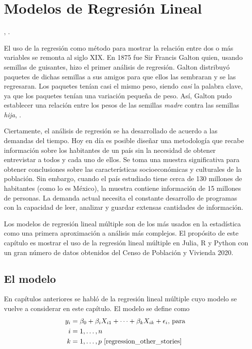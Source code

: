 \chapter{Modelos de Regresión Lineal}

, \cite{seber2003linear}. 

El uso de la regresión como método para mostrar la relación entre dos o más variables se remonta al siglo XIX. En 1875 fue Sir Francis Galton quien, usando semillas de guisantes, hizo el primer análisis de regresión. Galton distribuyó paquetes de dichas semillas a sus amigos para que ellos las sembraran y se las regresaran. Los paquetes tenían casi el mismo peso, siendo \textit{casi} la palabra clave, ya que los paquetes tenían una variación pequeña de peso. Así, Galton pudo establecer una relación entre los pesos de las semillas \textit{madre} contra las semillas \textit{hija}, \cite{stanton2001galton}. 

Ciertamente, el análisis de regresión se ha desarrollado de acuerdo a las demandas del tiempo. Hoy en día es posible diseñar una metodología que recabe información sobre los habitantes de un país sin la necesidad de obtener entrevistar a todos y cada uno de ellos. Se toma una muestra significativa para obtener conclusiones sobre las características socioeconómicas y culturales de la población. Sin embargo, cuando el país estudiado tiene cerca de 130 millones de habitantes (como lo es México), la muestra contiene información de 15 millones de personas. La demanda actual necesita el constante desarrollo de programas con la capacidad de leer, analizar y guardar extensas cantidades de información. 

Los modelos de regresión lineal múltiple son de los más usados en la estadística como una primera aproximación a análisis más complejos. El propósito de este capítulo es mostrar el uso de la regresión lineal múltiple  en \textsf{Julia, R} y \textsf{Python} con un gran número de datos obtenidos del Censo de Población y Vivienda 2020.  


\section{El modelo}
En capítulos anteriores se habló de la regresión lineal múltiple cuyo modelo se vuelve a considerar en este capítulo. El modelo se define como 
\begin{equation} \label{rlm_eq}
    \begin{aligned}
    y_i &= \beta_0 + \beta_i X_{i1} + \dots + \beta_k X_{ik} + \epsilon_i \text{, para } \\
    i &= 1, \dots, n \\ 
    k &= 1, \dots, p 
	\text{ \cite[p.~146]{regression_other_stories}}
    \end{aligned}
\end{equation}

